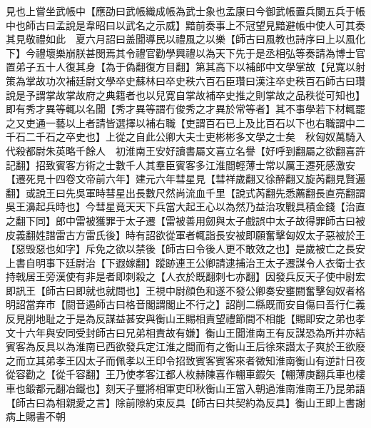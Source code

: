 見也上嘗坐武帳中【應劭曰武帳織成帳為武士象也孟康曰今御武帳置兵闌五兵于帳中也師古曰孟說是韋昭曰以武名之示威】黯前奏事上不冠望見黯避帳中使人可其奏其見敬禮如此　夏六月詔曰盖聞導民以禮風之以樂【師古曰風教也詩序曰上以風化下】今禮壞樂崩朕甚閔焉其令禮官勸學興禮以為天下先于是丞相弘等奏請為博士官置弟子五十人復其身【為于偽翻復方目翻】第其高下以補郎中文學掌故【兒寛以射策為掌故功次補廷尉文學卒史蘇林曰卒史秩六百石臣瓚曰漢注卒史秩百石師古曰瓚說是予謂掌故掌故府之典籍者也以兒寛自掌故補卒史推之則掌故之品秩從可知也】即有秀才異等輒以名聞【秀才異等謂冇俊秀之才異於常等者】其不事學若下材輒罷之又吏通一藝以上者請皆選擇以補右職【吏謂百石已上及比百石以下也右職謂中二千石二千石之卒史也】上從之自此公卿大夫士吏彬彬多文學之士矣　秋匈奴萬騎入代殺都尉朱英略千餘人　初淮南王安好讀書屬文喜立名譽【好呼到翻屬之欲翻喜許記翻】招致賓客方術之士數千人其羣臣賓客多江淮間輕薄士常以厲王遷死感激安【遷死見十四卷文帝前六年】建元六年彗星見【彗祥歲翻又徐醉翻又旋芮翻見賢遍翻】或說王曰先吳軍時彗星出長數尺然尚流血千里【說式芮翻先悉薦翻長直亮翻謂吳王濞起兵時也】今彗星竟天天下兵當大起王心以為然乃益治攻戰具積金錢【治直之翻下同】郎中雷被獲罪于太子遷【雷被善用劒與太子戲誤中太子故得罪師古曰被皮義翻姓譜雷古方雷氏後】時有詔欲從軍者輒詣長安被即願奮擊匈奴太子惡被於王【惡毁惡也如字】斥免之欲以禁後【師古曰令後人更不敢效之也】是歲被亡之長安上書自明事下廷尉治【下遐嫁翻】蹤跡連王公卿請逮捕治王太子遷謀令人衣衛士衣持戟居王旁漢使有非是者即刺殺之【人衣於既翻刺七亦翻】因發兵反天子使中尉宏即訊王【師古曰即就也就問也】王視中尉顔色和遂不發公卿奏安壅閼奮擊匈奴者格明詔當弃市【閼音遏師古曰格音閣謂閣止不行之】詔削二縣既而安自傷曰吾行仁義反見削地耻之于是為反謀益甚安與衡山王賜相責望禮節間不相能【賜即安之弟也孝文十六年與安同受封師古曰兄弟相責故有嫌】衡山王聞淮南王有反謀恐為所并亦結賓客為反具以為淮南已西欲發兵定江淮之間而有之衡山王后徐來譛太子爽於王欲廢之而立其弟孝王囚太子而佩孝以王印令招致賓客賓客來者微知淮南衡山有逆計日夜從容勸之【從千容翻】王乃使孝客江都人枚赫陳喜作輣車鍜矢【輣薄庚翻兵車也樓車也鍛都元翻冶鐵也】刻天子璽將相軍吏印秋衡山王當入朝過淮南淮南王乃昆弟語【師古曰為相親愛之言】除前隙約束反具【師古曰共契約為反具】衡山王即上書謝病上賜書不朝

